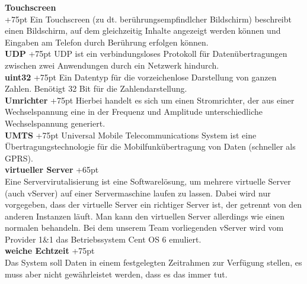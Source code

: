 \documentclass[fontsize = 12pt, paper = a4]{scrreprt}
\begin{document}
\textbf{Touchscreen} \\
\hangindent+75pt  
{Ein Touchscreen (zu dt. berührungsempfindlcher Bildschirm) beschreibt einen Bildschirm, auf dem gleichzeitig Inhalte angezeigt werden können und Eingaben am Telefon durch Berührung erfolgen können.\\

\textbf{UDP}
\hangindent+75pt 
\hspace*{13mm}
UDP ist ein verbindungsloses Protokoll für Datenübertragungen zwischen zwei Anwendungen durch ein Netzwerk hindurch.\\

\textbf{uint32}
\hangindent+75pt  
\hspace*{11mm}
Ein Datentyp für die vorzeichenlose Darstellung von ganzen Zahlen. Benötigt 32 Bit für die Zahlendarstellung.\\

\textbf{Umrichter}
\hangindent+75pt 
\hspace*{2.5mm}
Hierbei handelt es sich um einen Stromrichter, der aus einer Wechselspannung eine in der Frequenz und Amplitude unterschiedliche Wechselspannung generiert.\\

\textbf{UMTS}
\hangindent+75pt 
\hspace*{10.5mm}
Universal Mobile Telecommunications System ist eine Übertragungstechnologie für die Mobilfunkübertragung von Daten (schneller als GPRS).\\

\textbf{virtueller Server}
\hangindent+65pt  \\
Eine Servervirutalisierung ist eine Softwarelösung, um mehrere virtuelle Server (auch vServer) auf einer Servermaschine laufen zu lassen. Dabei wird nur vorgegeben, dass der virtuelle Server ein richtiger Server ist, der getrennt von den anderen Instanzen läuft. Man kann den virtuellen Server allerdings wie einen normalen behandeln. Bei dem unserem Team vorliegenden vServer wird vom Provider 1\&1 das Betriebssystem Cent OS 6 emuliert.\\


\textbf{weiche Echtzeit}
\hangindent+75pt  \\
Das System soll Daten in einem festgelegten Zeitrahmen zur Verfügung stellen, es muss aber nicht gewährleistet werden, dass es das immer tut.\\

}
\end{document}
